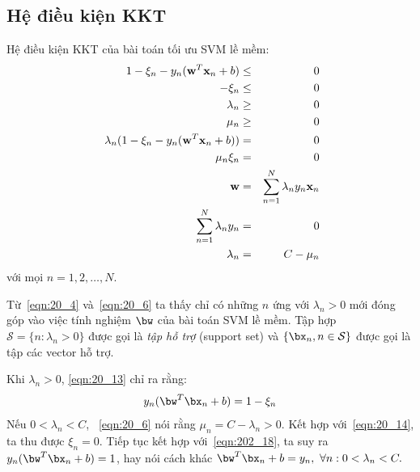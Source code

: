  
\subsection{Hệ điều kiện KKT}

Hệ điều kiện KKT của bài toán tối ưu SVM lề mềm:
\begin{eqnarray}  
    \label{eqn:20_9}
    1 - \xi_n - y_n(\mathbf{w}^T\mathbf{x}_n + b) &\leq& 0  \\\ 
    \label{eqn:20_10}
    -\xi_n &\leq& 0 \\\ 
    \label{eqn:20_11}
    \lambda_n &\geq& 0 \\\ 
    \label{eqn:20_12}
    \mu_n &\geq & 0 \\\ 
    \label{eqn:20_13}
    \lambda_n ( 1 - \xi_n - y_n(\mathbf{w}^T\mathbf{x}_n + b)) &=& 0 \\\ 
    \label{eqn:20_14}
    \mu_n \xi_n &=& 0 \\\ 
    \setcounter{equation}{6}
    \label{eqn:20_4}
    \mathbf{w} &=& \sum_{n=1}^N \lambda_n y_n \mathbf{x}_n \\\ 
    \sum_{n=1}^N \lambda_n y_n &=& 0 \\\ 
    \label{eqn:20_6}
\lambda_n &=& C - \mu_n 
\end{eqnarray} 
với
mọi $n = 1, 2, \dots, N$.

Từ~\eqref{eqn:20_4} và~\eqref{eqn:20_6} ta thấy chỉ có những $n$ ứng với $\lambda_n > 0$ mới đóng
góp
vào việc tính nghiệm $\bw$ của bài toán SVM lề mềm. Tập hợp $\mathcal{S} = \{n: \lambda_n > 0\}$
được gọi là \textit{tập hỗ trợ} (support set) và $\{\bx_n, n \in \mathcal{S}\}$ được gọi là
tập các vector hỗ trợ.
\setcounter{equation}{17}

\def\NM{N_{\mathcal{M}}}
Khi $\lambda_n > 0$, \eqref{eqn:20_13} chỉ ra rằng: 
\begin{equation}
    \label{eqn:202_18}
    y_n(\bw^T\bx_n + b) = 1 - \xi_n
\end{equation}
Nếu $0<\lambda_n < C$, ~\eqref{eqn:20_6} nói rằng $\mu_n = C
- \lambda_n > 0$. Kết hợp với~\eqref{eqn:20_14}, ta thu được $\xi_n = 0$. Tiếp
tục kết hợp với~\eqref{eqn:202_18}, ta suy ra $y_n(\bw^T\bx_n + b) = 1$, hay nói
cách khác
\begin{math}
    \bw^T\bx_n + b = y_n, ~\forall n: 0 < \lambda_n < C. 
\end{math}


